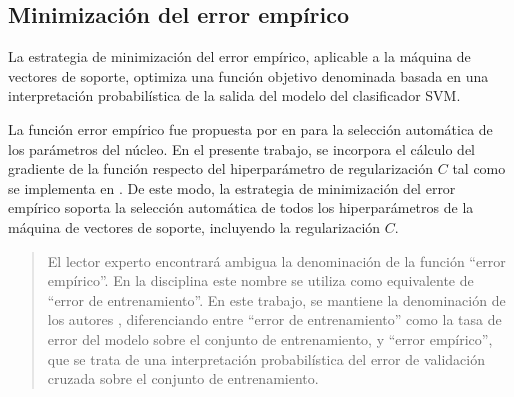 %
%
\subsection{Minimización del error empírico}
%
La estrategia de minimización del error empírico, aplicable a la
máquina de vectores de soporte, optimiza una función objetivo
denominada  basada en una interpretación
probabilística de la salida del modelo del clasificador SVM.

La función error empírico fue propuesta por \citeauthor{ayat} en
\cite{ayat} para la selección automática de los parámetros del núcleo.
En el presente trabajo, se incorpora el cálculo del gradiente de la
función respecto del hiperparámetro de regularización $C$
\cite{keerthi,glasmachers} tal como se implementa en \cite{shark}.  De
este modo, la estrategia de minimización del error empírico soporta la
selección automática de todos los hiperparámetros de la máquina de
vectores de soporte, incluyendo la regularización $C$.
%
\begin{quote}
  El lector experto encontrará ambigua la denominación de la función
  ``error empírico''.  En la disciplina este nombre se utiliza como
  equivalente de ``error de entrenamiento''.  En este trabajo, se
  mantiene la denominación de los autores \cite{ayat}, diferenciando
  entre ``error de entrenamiento'' como la tasa de error del modelo
  sobre el conjunto de entrenamiento, y ``error empírico'', que se
  trata de una interpretación probabilística del error de validación
  cruzada sobre el conjunto de entrenamiento.
\end{quote}
%
